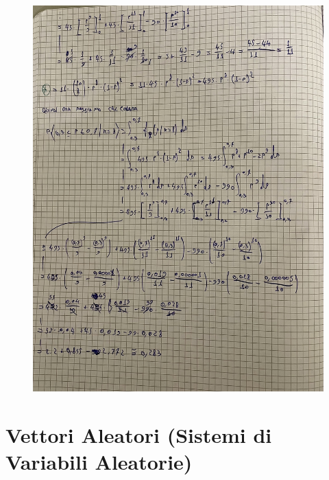 \documentclass{article}
\begin{document}
\begin{figure}[ht]
\centering
\includegraphics[scale=0.10]{ese/41a.jpeg}
\end{figure}

\section{Vettori Aleatori (Sistemi di Variabili Aleatorie)}
\end{document}
